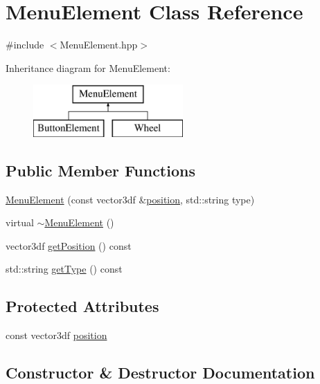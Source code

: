 \hypertarget{class_menu_element}{}\section{Menu\+Element Class Reference}
\label{class_menu_element}


{\ttfamily \#include $<$Menu\+Element.\+hpp$>$}

Inheritance diagram for Menu\+Element\+:\begin{figure}[H]
\begin{center}
\leavevmode
\includegraphics[height=2.000000cm]{class_menu_element}
\end{center}
\end{figure}
\subsection*{Public Member Functions}
\begin{DoxyCompactItemize}
\item 
\mbox{\hyperlink{class_menu_element_af790322eafe78c8a69bccf4001e128b0}{Menu\+Element}} (const vector3df \&\mbox{\hyperlink{class_menu_element_a7f59490282ff54f6c82ee478c8ea6cc1}{position}}, std\+::string type)
\item 
virtual \mbox{\hyperlink{class_menu_element_a3c21f82d271e0435d3103d7847142f5c}{$\sim$\+Menu\+Element}} ()
\item 
vector3df \mbox{\hyperlink{class_menu_element_adc73fb1d0615667eaf3f5328f577996d}{get\+Position}} () const
\item 
std\+::string \mbox{\hyperlink{class_menu_element_ad0702505a011be10b7916650994d8d4e}{get\+Type}} () const
\end{DoxyCompactItemize}
\subsection*{Protected Attributes}
\begin{DoxyCompactItemize}
\item 
const vector3df \mbox{\hyperlink{class_menu_element_a7f59490282ff54f6c82ee478c8ea6cc1}{position}}
\end{DoxyCompactItemize}


\subsection{Constructor \& Destructor Documentation}
\mbox{\label{class_menu_element_af790322eafe78c8a69bccf4001e128b0}} 
